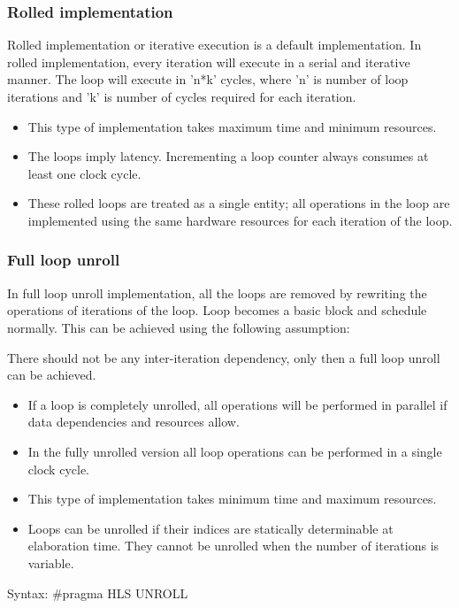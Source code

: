 \subsubsection{Rolled implementation}
Rolled implementation or iterative execution is a default implementation. In rolled implementation, every iteration will execute in a serial and iterative manner. The loop will execute in 'n*k' cycles, where 'n' is number of loop iterations and 'k' is number of cycles required for each iteration. 
\begin{itemize}
  \item This type of implementation takes maximum time and minimum resources.
  \item The loops imply latency. Incrementing a loop counter always consumes at least one clock cycle.
  \item These rolled loops are treated as a single entity; all operations in the loop are implemented using the same hardware resources for each iteration of the loop.
\end{itemize}

\subsubsection{Full loop unroll}
In full loop unroll implementation, all the loops are removed by rewriting the operations of iterations of the loop. Loop becomes a basic block and schedule normally. This can be achieved using the following assumption:
\begin{highlight}
  There should not be any inter-iteration dependency, only then a full loop unroll can be achieved.
\end{highlight}

\begin{itemize}
  \item If a loop is completely unrolled, all operations will be performed in  parallel if data dependencies and resources allow. 
  \item In the fully unrolled version all loop operations can be performed in a single clock cycle.
  \item This type of implementation takes minimum time and maximum resources.
  \item Loops can be unrolled if their indices are statically determinable at elaboration time. They cannot be unrolled when the number of iterations is variable.
\end{itemize}

Syntax: \#pragma HLS UNROLL

